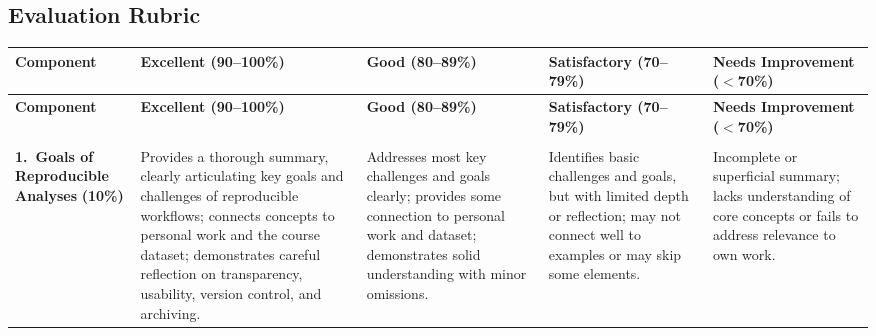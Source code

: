 \begin{landscape}

    \section{Evaluation Rubric}

    {\footnotesize

    \begin{longtable}{%
        >{\RaggedRight\arraybackslash}p{2.5cm}   %
        >{\RaggedRight\arraybackslash}p{4.5cm}   %
        >{\RaggedRight\arraybackslash}p{4.2cm}   %
        >{\RaggedRight\arraybackslash}p{4.2cm}   %
        >{\RaggedRight\arraybackslash}p{4.5cm}}  %

    \toprule
    \textbf{Component} &
    \textbf{Excellent (90--100\%)} &
    \textbf{Good (80--89\%)} &
    \textbf{Satisfactory (70--79\%)} &
    \textbf{Needs Improvement ($<$70\%)} \\
    \midrule
    \endfirsthead

    \toprule
    \textbf{Component} &
    \textbf{Excellent (90--100\%)} &
    \textbf{Good (80--89\%)} &
    \textbf{Satisfactory (70--79\%)} &
    \textbf{Needs Improvement ($<$70\%)} \\
    \midrule
    \endhead

    \midrule
    \multicolumn{5}{r}{\textit{Continued on next page}} \\
    \endfoot

    \bottomrule
    \endlastfoot

    \textbf{1.\ Goals of Reproducible Analyses}
    \newline\textbf{(10\%)}
    &
    Provides a thorough summary, clearly articulating key goals and challenges
    of reproducible workflows; connects concepts to personal work and the
    course dataset; demonstrates careful reflection on transparency,
    usability, version control, and archiving.
    &
    Addresses most key challenges and goals clearly; provides some connection
    to personal work and dataset; demonstrates solid understanding with minor
    omissions.
    &
    Identifies basic challenges and goals, but with limited depth or
    reflection; may not connect well to examples or may skip some elements.
    &
    Incomplete or superficial summary; lacks understanding of core concepts
    or fails to address relevance to own work.
    \\
    \midrule


\end{longtable}}
\end{landscape}

